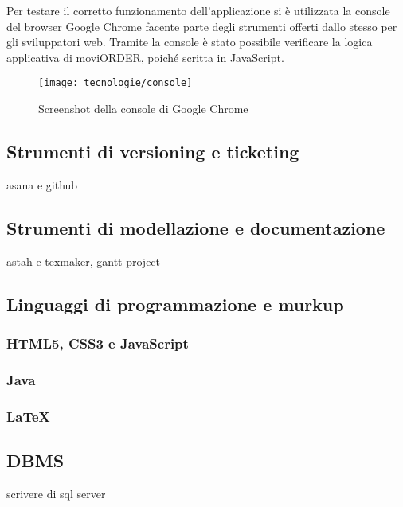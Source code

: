 Per testare il corretto funzionamento dell'applicazione si è utilizzata la console del browser Google Chrome facente parte degli strumenti offerti dallo stesso per gli sviluppatori web. Tramite la console è stato possibile verificare la logica applicativa di moviORDER, poiché scritta in JavaScript.

\begin{figure}[!h] 
    \centering 
    \texttt{[image: tecnologie/console]} 
    \caption{Screenshot della console di Google Chrome}
\end{figure}

\subsection{Strumenti di versioning e ticketing}
asana e github

\subsection{Strumenti di modellazione e documentazione}
astah e texmaker, gantt project

\subsection{Linguaggi di programmazione e murkup}

\subsubsection{HTML5, CSS3 e JavaScript}

\subsubsection{Java}

\subsubsection{\LaTeX{}}

\subsection{DBMS}
scrivere di sql server



